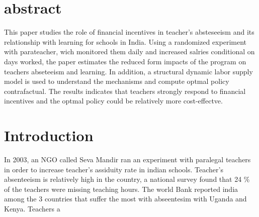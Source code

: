 \section*{abstract}

This paper studies the role of financial incentives in teacher's absteseeism and its 
relationship with learning for schools in India. Using a randomized experiment with parateacher, 
wich monitored them daily and increased salries conditional on days worked,
the paper estimates the reduced form impacts of the program on teachers abseteeism and learning. 
In addition, a structural dynamic labor supply model is used to understand the mechanisms 
and compute optmal policy contrafactual. The results indicates that teachers strongly respond
to financial incentives and the optmal policy could be relatively more cost-effectve.

\section*{Introduction}

In 2003, an NGO called Seva Mandir ran an experiment with paralegal teachers in order to 
increase teacher's assiduity rate in indian schools. Teacher's absenteeism is relatively high
in the country, a national survey found that 24 \% of the teachers were missing teaching hours. 
The world Bank reported india among the 3 countries that suffer the most with abseentesim
with Uganda and Kenya. Teachers a


